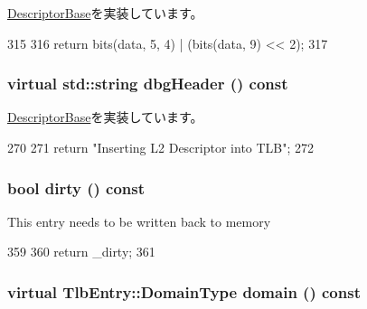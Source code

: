 \hyperlink{classArmISA_1_1TableWalker_1_1DescriptorBase_ab524583b20762c07d0a20a418b858586}{DescriptorBase}を実装しています。


\begin{DoxyCode}
315         {
316            return bits(data, 5, 4) | (bits(data, 9) << 2);
317         }
\end{DoxyCode}
\hypertarget{classArmISA_1_1TableWalker_1_1L2Descriptor_ac7721f9b49eadf35e0a9f7715a346dbe}{
\subsubsection[{dbgHeader}]{\setlength{\rightskip}{0pt plus 5cm}virtual std::string dbgHeader () const}}
\label{classArmISA_1_1TableWalker_1_1L2Descriptor_ac7721f9b49eadf35e0a9f7715a346dbe}


\hyperlink{classArmISA_1_1TableWalker_1_1DescriptorBase_a16f3fe8786507522f0f0298cb6c414f1}{DescriptorBase}を実装しています。


\begin{DoxyCode}
270         {
271             return "Inserting L2 Descriptor into TLB\n";
272         }
\end{DoxyCode}
\hypertarget{classArmISA_1_1TableWalker_1_1L2Descriptor_ade104a269a8f8f3ef5ded192aede7991}{
\subsubsection[{dirty}]{\setlength{\rightskip}{0pt plus 5cm}bool dirty () const}}
\label{classArmISA_1_1TableWalker_1_1L2Descriptor_ade104a269a8f8f3ef5ded192aede7991}
This entry needs to be written back to memory 


\begin{DoxyCode}
359         {
360             return _dirty;
361         }
\end{DoxyCode}
\hypertarget{classArmISA_1_1TableWalker_1_1L2Descriptor_a37c4e606592a36c252f287c3399a6fb4}{
\subsubsection[{domain}]{\setlength{\rightskip}{0pt plus 5cm}virtual {\bf TlbEntry::DomainType} domain () const}}
\label{classArmISA_1_1TableWalker_1_1L2Descriptor_a37c4e606592a36c252f287c3399a6fb4}


